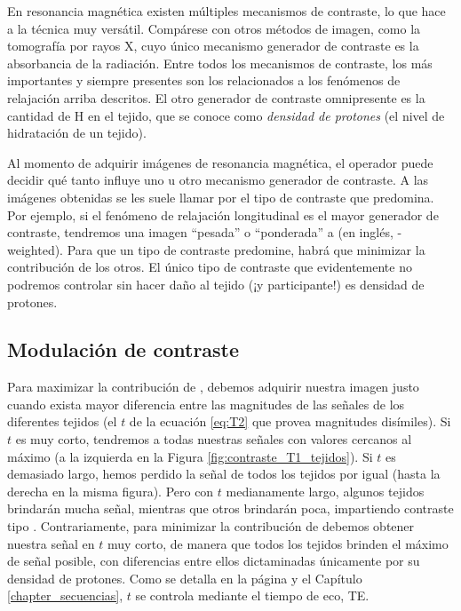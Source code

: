 En resonancia magnética existen múltiples mecanismos de contraste, lo que hace a la técnica muy versátil. Compárese con otros métodos de imagen, como la tomografía por rayos X, cuyo único mecanismo generador de contraste es la absorbancia de la radiación. Entre todos los mecanismos de contraste, los más importantes y siempre presentes son los relacionados a los fenómenos de relajación arriba descritos. El otro generador de contraste omnipresente es la cantidad de H en el tejido, que se conoce como \textit{densidad de protones} (el nivel de hidratación de un tejido). 

Al momento de adquirir imágenes de resonancia magnética, el operador puede decidir qué tanto influye uno u otro mecanismo generador de contraste. A las imágenes obtenidas se les suele llamar por el tipo de contraste que predomina. Por ejemplo, si el fenómeno de relajación longitudinal es el mayor generador de contraste, tendremos una imagen ``pesada'' o ``ponderada'' a \Tone (en inglés, \Tone-weighted). Para que un tipo de contraste predomine, habrá que minimizar la contribución de los otros. El único tipo de contraste que evidentemente no podremos controlar sin hacer daño al tejido (¡y participante!) es densidad de protones.

\subsection{Modulación de contraste \Ttwo}
\label{sec:mod_contraste}
Para maximizar la contribución de \Ttwo, debemos adquirir nuestra imagen justo cuando exista mayor diferencia entre las magnitudes de las señales de los diferentes tejidos (el $t$ de la ecuación \ref{eq:T2} que provea magnitudes disímiles). Si $t$ es muy corto, tendremos a todas nuestras señales con valores cercanos al máximo (a la izquierda en la Figura \ref{fig:contraste_T1_tejidos}). Si $t$ es demasiado largo, hemos perdido la señal de todos los tejidos por igual (hasta la derecha en la misma figura). Pero con $t$ medianamente largo, algunos tejidos brindarán mucha señal, mientras que otros brindarán poca, impartiendo contraste tipo \Ttwo. Contrariamente, para minimizar la contribución de \Ttwo debemos obtener nuestra señal en $t$ muy corto, de manera que todos los tejidos brinden el máximo de señal posible, con diferencias entre ellos dictaminadas únicamente por su densidad de protones. Como se detalla en la página \pageref{sec:imagenescomunes} y el Capítulo \ref{chapter_secuencias}, $t$ se controla mediante el tiempo de eco, TE. 

